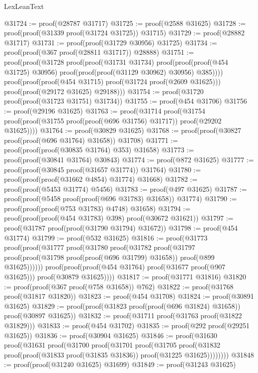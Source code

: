 \begin{lexlean}{LexLeanText}
\begin{coremodule}
@31724 := proof(@28787 @31717)
@31725 := proof(@2588 @31625)
@31728 := proof(proof(@31339 proof(@31724 @31725)) @31715)
@31729 := proof(@28882 @31717)
@31731 := proof(proof(@31729 @30956) @31725)
@31734 := proof(proof(@367 proof(@28811 @31717)) @28888)
@31751 := proof(proof(@31728
        proof(proof(@31731 @31734)
            proof(proof(proof(@454 @31725) @30956) proof(proof(proof(@31129 @30962) @30956) @385))))
      proof(proof(proof(@454 @31715) proof(@31724 proof(@2609 @31625)))
          proof(proof(@29172 @31625) @29188)))
@31754 := proof(@31720 proof(proof(@31723 @31751) @31734))
@31755 := proof(@454 @31706)
@31756 := proof(@29196 @31625)
@31763 := proof(@31714
      proof(@31754 proof(proof(@31755 proof(proof(@696 @31756) @31717)) proof(@29202 @31625))))
@31764 := proof(@30829 @31625)
@31768 := proof(proof(@30827 proof(proof(@696 @31764) @31658)) @31708)
@31771 := proof(proof(proof(@30835 @31764) @353) @31658)
@31773 := proof(proof(@30841 @31764) @30843)
@31774 := proof(@872 @31625)
@31777 := proof(proof(@30845 proof(@31657 @31774)) @31764)
@31780 := proof(proof(proof(@31662 @4854) @31774) @31668)
@31782 := proof(proof(@5453 @31774) @5456)
@31783 := proof(@497 @31625)
@31787 := proof(proof(@5458 proof(proof(@696 @31783) @31658)) @31774)
@31790 := proof(proof(proof(@753 @31783) @4748) @31658)
@31794 := proof(proof(proof(@454 @31783) @398) proof(@30672 @31621))
@31797 := proof(@31787 proof(proof(@31790 @31794) @31672))
@31798 := proof(@454 @31774)
@31799 := proof(@532 @31625)
@31816 := proof(@31773
      proof(proof(@31777
            proof(@31780
                proof(@31782
                    proof(@31797
                        proof(proof(@31798 proof(proof(@696 @31799) @31658)) proof(@899 @31625))))))
          proof(proof(proof(@454 @31764) proof(@31677 proof(@907 @31625))) proof(@30879 @31625))))
@31817 := proof(@31771 @31816)
@31820 := proof(proof(@367 proof(@758 @31658)) @762)
@31822 := proof(@31768 proof(@31817 @31820))
@31823 := proof(@454 @31708)
@31824 := proof(@30891 @31625)
@31829 := proof(proof(@31823 proof(proof(@696 @31824) @31658)) proof(@30897 @31625))
@31832 := proof(@31711 proof(@31763 proof(@31822 @31829)))
@31833 := proof(@454 @31702)
@31835 := proof(@292 proof(@29251 @31625))
@31836 := proof(@30904 @31625)
@31846 := proof(@31630
      proof(@31631
          proof(@31700
              proof(@31701
                  proof(@31705
                      proof(@31832
                          proof(proof(@31833 proof(@31835 @31836)) proof(@31225 @31625))))))))
@31848 := proof(proof(@31240 @31625) @31699)
@31849 := proof(@31243 @31625)

\end{coremodule}
\end{lexlean}
